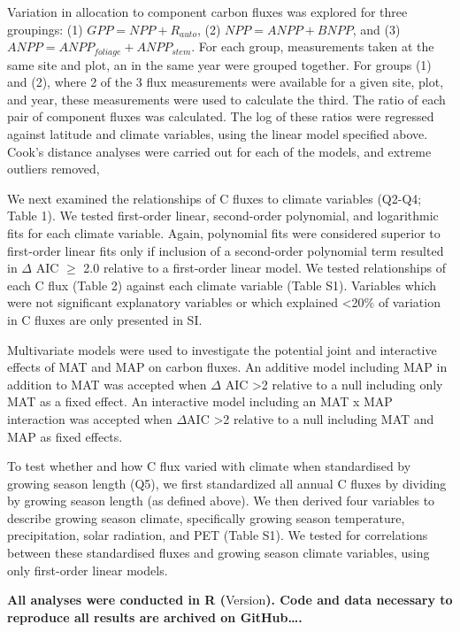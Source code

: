 \documentclass[
]{article}
\begin{document}
Variation in allocation to component carbon fluxes was explored for
three groupings: (1) \(GPP = NPP + R_{auto}\), (2)
\(NPP = ANPP + BNPP\), and (3) \(ANPP = ANPP_{foliage} + ANPP_{stem}\).
For each group, measurements taken at the same site and plot, an in the
same year were grouped together. For groups (1) and (2), where 2 of the
3 flux measurements were available for a given site, plot, and year,
these measurements were used to calculate the third. The ratio of each
pair of component fluxes was calculated. The log of these ratios were
regressed against latitude and climate variables, using the linear model
specified above. Cook's distance analyses were carried out for each of
the models, and extreme outliers removed,

We next examined the relationships of C fluxes to climate variables
(Q2-Q4; Table 1). We tested first-order linear, second-order polynomial,
and logarithmic fits for each climate variable. Again, polynomial fits
were considered superior to first-order linear fits only if inclusion of
a second-order polynomial term resulted in \(\Delta\) AIC \(\ge\) 2.0
relative to a first-order linear model. We tested relationships of each
C flux (Table 2) against each climate variable (Table S1). Variables
which were not significant explanatory variables or which explained
\textless20\% of variation in C fluxes are only presented in SI.

Multivariate models were used to investigate the potential joint and
interactive effects of MAT and MAP on carbon fluxes. An additive model
including MAP in addition to MAT was accepted when \(\Delta\) AIC
\textgreater2 relative to a null including only MAT as a fixed effect.
An interactive model including an MAT x MAP interaction was accepted
when \(\Delta\)AIC \textgreater2 relative to a null including MAT and
MAP as fixed effects.

To test whether and how C flux varied with climate when standardised by
growing season length (Q5), we first standardized all annual C fluxes by
dividing by growing season length (as defined above). We then derived
four variables to describe growing season climate, specifically growing
season temperature, precipitation, solar radiation, and PET (Table S1).
We tested for correlations between these standardised fluxes and growing
season climate variables, using only first-order linear models.

\textbf{All analyses were conducted in R (}Version\textbf{). Code and
data necessary to reproduce all results are archived on GitHub\ldots.}
\end{document}
